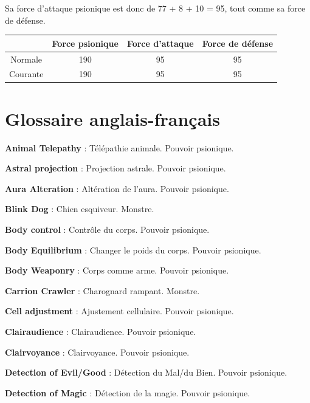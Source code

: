 \documentclass[11pt]{article}
\begin{document}
{\bigskip

Sa force d'attaque psionique est donc de 77 + 8 + 10 = 95, tout comme sa force de défense.

\bigskip

\begin{tabular}{|c|c|c|c|}
\hline
& \textbf{Force psionique} & \textbf{Force d'attaque} & \textbf{Force de défense}  \\ \hline
Normale     & 190 & 95 & 95 \\ \hline
Courante    & 190 & 95 & 95 \\ \hline
\end{tabular}






\newpage
{}\section*{Glossaire anglais-français}

{\parindent0cm

\textbf{Animal Telepathy} : Télépathie animale. Pouvoir psionique.

\textbf{Astral projection} : Projection astrale. Pouvoir psionique.

\textbf{Aura Alteration} : Altération de l'aura. Pouvoir psionique.

\textbf{Blink Dog} : Chien esquiveur. Monstre.

\textbf{Body control} : Contrôle du corps. Pouvoir psionique.

\textbf{Body Equilibrium} : Changer le poids du corps. Pouvoir psionique.

\textbf{Body Weaponry} : Corps comme arme. Pouvoir psionique.

\textbf{Carrion Crawler} : Charognard rampant. Monstre.

\textbf{Cell adjustment} : Ajustement cellulaire. Pouvoir psionique.

\textbf{Clairaudience} : Clairaudience. Pouvoir psionique.

\textbf{Clairvoyance} : Clairvoyance. Pouvoir psionique.

\textbf{Detection of Evil/Good} : Détection du Mal/du Bien. Pouvoir psionique.

\textbf{Detection of Magic} : Détection de la magie. Pouvoir psionique.

}}
\end{document}
